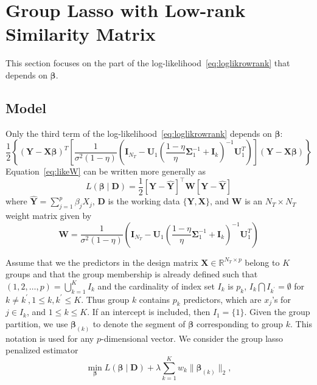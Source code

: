 \documentclass[12pt,letter]{article}\usepackage[]{graphicx}\usepackage[]{color}
\newcommand{\by}{\textbf{\emph{y}}}
\newcommand{\bX}{\textbf{X}}
\newcommand{\bW}{\textbf{W}}
\newcommand{\bY}{\textbf{Y}}
\newcommand{\bD}{\textbf{D}}
\newcommand{\bU}{\textbf{U}}
\newcommand{\bI}{\textbf{I}}
\newcommand{\bSigma}{\boldsymbol{\Sigma}}
\newcommand{\bbeta}{\boldsymbol{\beta}}
\newcommand{\bbk}{\boldsymbol{\beta}_{(k)}}
\begin{document}
\section{Group Lasso with Low-rank Similarity Matrix}
This section focuses on the part of the log-likelihood~\eqref{eq:loglikrowrank} that depends on $\bbeta$.

\subsection{Model}
Only the third term of the log-likelihood~\eqref{eq:loglikrowrank} depends on $\bbeta$:
\begin{equation}
	\frac{1}{2} \left\lbrace \left(\bY - \bX\bbeta \right)^T  \left[\frac{1}{\sigma^2(1-\eta)}\left(  \bI_{N_T} - \bU_1 \left(\frac{1-\eta}{\eta}\bSigma_1^{-1} + \bI_{k}\right) ^{-1}\bU_1^T \right)  \right] \left(\bY - \bX\bbeta \right)  \right\rbrace \label{eq:likeW}
\end{equation}
Equation~\eqref{eq:likeW} can be written more generally as
\[
L(\bbeta\mid\bD)=\frac{1}{2}\left[\bY-\widehat{\bY}\right]^{\top}\mathbf{W}\left[\bY-\widehat{\bY}\right]
\]
where $\widehat{\bY}=\sum_{j=1}^{p}\beta_{j}X_{j}$, $\bD$ is the working data $\lbrace \bY, \bX \rbrace$, and $\bW$ is an $N_T \times N_T$ weight matrix given by
\begin{equation}
	\bW = \frac{1}{\sigma^2(1-\eta)}\left(  \bI_{N_T} - \bU_1 \left(\frac{1-\eta}{\eta}\bSigma_1^{-1} + \bI_{k}\right) ^{-1}\bU_1^T \right)   \label{eq:weight}
\end{equation}

Assume that we the predictors in the design matrix $\bX \in \mathbb{R}^{N_T \times p}$ belong to $K$ groups and that the group membership is already defined such that $(1,2,\ldots,p)=\bigcup_{k=1}^{K}I_{k}$ and the cardinality of index set $I_{k}$ is $p_{k}$, $I_{k}\bigcap I_{k^{\prime}}=\emptyset$ for $k\neq k^{\prime},1\le k,k^{\prime}\le K$. Thus group $k$ contains $p_{k}$ predictors, which are $x_{j}$'s for $j\in I_{k}$, and $1\le k\le K.$ If an intercept is included, then $I_{1}=\{1\}$. Given the group partition, we use $\bbeta_{(k)}$ to denote the segment of $\bbeta$ corresponding to group $k$. This notation is used for any $p$-dimensional vector.
We consider the group lasso penalized estimator
\begin{equation}
	\min_{\bbeta}L(\bbeta \mid \bD)+\lambda\sum_{k=1}^{K}w_{k}\|\bbk\|_{2},\label{eq:wlslasso}
\end{equation}
\end{document}
